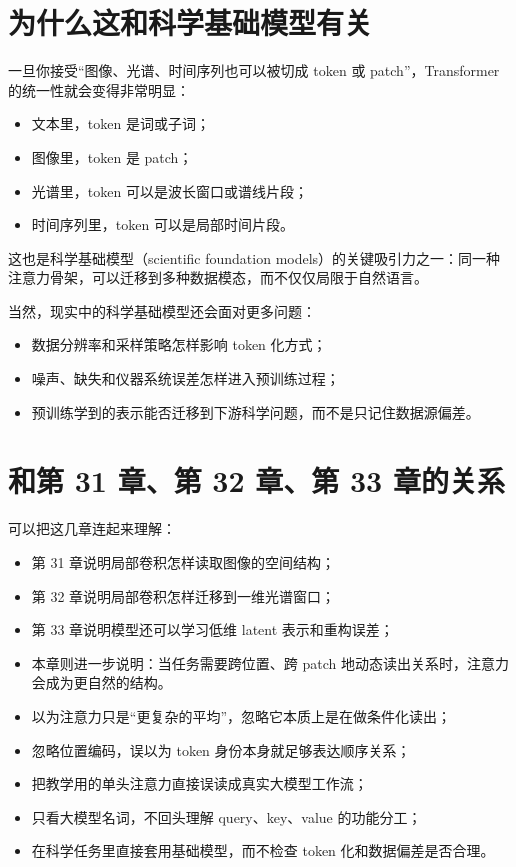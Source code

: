 \section{为什么这和科学基础模型有关}

一旦你接受“图像、光谱、时间序列也可以被切成 token 或 patch”，Transformer 的统一性就会变得非常明显：

\begin{itemize}
    \item 文本里，token 是词或子词；
    \item 图像里，token 是 patch；
    \item 光谱里，token 可以是波长窗口或谱线片段；
    \item 时间序列里，token 可以是局部时间片段。
\end{itemize}

这也是科学基础模型（scientific foundation models）的关键吸引力之一：同一种注意力骨架，可以迁移到多种数据模态，而不仅仅局限于自然语言。

当然，现实中的科学基础模型还会面对更多问题：

\begin{itemize}
    \item 数据分辨率和采样策略怎样影响 token 化方式；
    \item 噪声、缺失和仪器系统误差怎样进入预训练过程；
    \item 预训练学到的表示能否迁移到下游科学问题，而不是只记住数据源偏差。
\end{itemize}

\section{和第 31 章、第 32 章、第 33 章的关系}

可以把这几章连起来理解：

\begin{itemize}
    \item 第 31 章说明局部卷积怎样读取图像的空间结构；
    \item 第 32 章说明局部卷积怎样迁移到一维光谱窗口；
    \item 第 33 章说明模型还可以学习低维 latent 表示和重构误差；
    \item 本章则进一步说明：当任务需要跨位置、跨 patch 地动态读出关系时，注意力会成为更自然的结构。
\end{itemize}

\begin{warnbox}
\begin{itemize}
    \item 以为注意力只是“更复杂的平均”，忽略它本质上是在做条件化读出；
    \item 忽略位置编码，误以为 token 身份本身就足够表达顺序关系；
    \item 把教学用的单头注意力直接误读成真实大模型工作流；
    \item 只看大模型名词，不回头理解 query、key、value 的功能分工；
    \item 在科学任务里直接套用基础模型，而不检查 token 化和数据偏差是否合理。
\end{itemize}
\end{warnbox}

